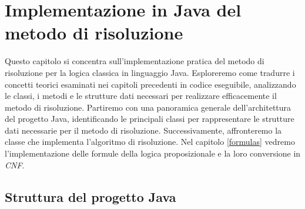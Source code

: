 \documentclass[a4paper,12pt]{report}
\begin{document}
% 
% 
\chapter{Implementazione in Java del metodo di risoluzione}
\label{impl}

Questo capitolo si concentra sull'implementazione pratica del metodo di risoluzione per la logica classica in linguaggio Java. Esploreremo come tradurre i concetti teorici esaminati nei capitoli precedenti in codice eseguibile, analizzando le classi, i metodi e le strutture dati necessari per realizzare efficacemente il metodo di risoluzione. Partiremo con una panoramica generale dell'architettura del progetto Java, identificando le principali classi per rappresentare le strutture dati necessarie per il metodo di risoluzione. Successivamente, affronteremo la classe che implementa l'algoritmo di risoluzione. Nel capitolo \ref{formulas} vedremo l'implementazione delle formule della logica proposizionale e la loro conversione in \emph{CNF}.

\section{Struttura del progetto Java}
\label{project_structure}
\end{document}
